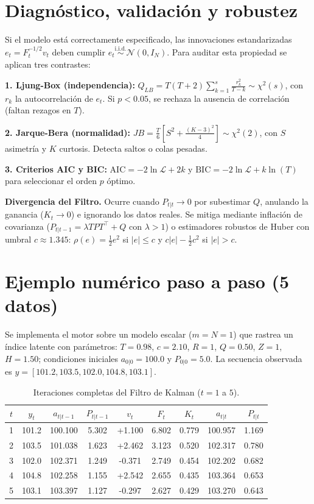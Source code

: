 \documentclass[10pt,twocolumn]{article}
\begin{document}
\section{Diagnóstico, validación y robustez}

Si el modelo está correctamente especificado, las innovaciones estandarizadas $e_t = F_t^{-1/2} v_t$ deben cumplir $e_t \overset{\text{i.i.d.}}{\sim} \mathcal{N}(0, I_N)$. Para auditar esta propiedad se aplican tres contrastes:

\noindent\textbf{1. Ljung-Box (independencia):} $Q_{LB} = T(T+2) \sum_{k=1}^s \frac{r_k^2}{T-k} \sim \chi^2(s)$, con $r_k$ la autocorrelación de $e_t$. Si $p < 0.05$, se rechaza la ausencia de correlación (faltan rezagos en $T$).

\noindent\textbf{2. Jarque-Bera (normalidad):} $JB = \frac{T}{6} [ S^2 + \frac{(K-3)^2}{4} ] \sim \chi^2(2)$, con $S$ asimetría y $K$ curtosis. Detecta saltos o colas pesadas.

\noindent\textbf{3. Criterios AIC y BIC:} $\text{AIC} = -2\ln\mathcal{L} + 2k$ y $\text{BIC} = -2\ln\mathcal{L} + k\ln(T)$ para seleccionar el orden $p$ óptimo.

\noindent\textbf{Divergencia del Filtro.} Ocurre cuando $P_{t|t} \to 0$ por subestimar $Q$, anulando la ganancia ($K_t \to 0$) e ignorando los datos reales. Se mitiga mediante inflación de covarianza ($P_{t|t-1} = \lambda T P T^\top + Q$ con $\lambda > 1$) o estimadores robustos de Huber con umbral $c \approx 1.345$: $\rho(e) = \frac{1}{2} e^2$ si $|e| \le c$ y $c|e| - \frac{1}{2}c^2$ si $|e| > c$.

\section{Ejemplo numérico paso a paso (5 datos)}

Se implementa el motor sobre un modelo escalar ($m=N=1$) que rastrea un índice latente con parámetros:
$T = 0.98$, $c = 2.10$, $R = 1$, $Q = 0.50$, $Z = 1$, $H = 1.50$; condiciones iniciales $a_{0|0} = 100.0$ y $P_{0|0} = 5.0$. La secuencia observada es $y = [101.2, 103.5, 102.0, 104.8, 103.1]$.

\begin{table}[h]
\centering
\footnotesize
\caption{Iteraciones completas del Filtro de Kalman ($t=1$ a $5$).}
\begin{tabular}{@{}ccccccccc@{}}
\toprule
$t$ & $y_t$ & $a_{t|t-1}$ & $P_{t|t-1}$ & $v_t$ & $F_t$ & $K_t$ & $a_{t|t}$ & $P_{t|t}$ \\
\midrule
1 & 101.2 & 100.100 & 5.302 & +1.100 & 6.802 & 0.779 & 100.957 & 1.169 \\
2 & 103.5 & 101.038 & 1.623 & +2.462 & 3.123 & 0.520 & 102.317 & 0.780 \\
3 & 102.0 & 102.371 & 1.249 & -0.371 & 2.749 & 0.454 & 102.202 & 0.682 \\
4 & 104.8 & 102.258 & 1.155 & +2.542 & 2.655 & 0.435 & 103.364 & 0.653 \\
5 & 103.1 & 103.397 & 1.127 & -0.297 & 2.627 & 0.429 & 103.270 & 0.643 \\
\bottomrule
\end{tabular}
\label{tab:ejemplo}
\end{table}
\end{document}

